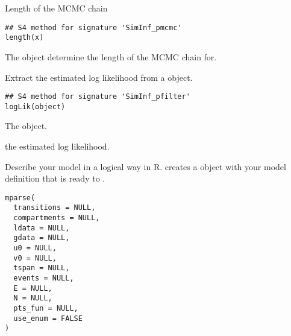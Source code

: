\documentclass[letterpaper]{book}
\begin{document}
%
\begin{Description}
Length of the MCMC chain
\end{Description}
%
\begin{Usage}
\begin{verbatim}
## S4 method for signature 'SimInf_pmcmc'
length(x)
\end{verbatim}
\end{Usage}
%
\begin{Arguments}
\begin{ldescription}
\item[\code{x}] The  object determine the length of
the MCMC chain for.
\end{ldescription}
\end{Arguments}
%
\begin{Description}
Extract the estimated log likelihood from a 
object.
\end{Description}
%
\begin{Usage}
\begin{verbatim}
## S4 method for signature 'SimInf_pfilter'
logLik(object)
\end{verbatim}
\end{Usage}
%
\begin{Arguments}
\begin{ldescription}
\item[\code{object}] The  object.
\end{ldescription}
\end{Arguments}
%
\begin{Value}
the estimated log likelihood.
\end{Value}
%
\begin{Description}
Describe your model in a logical way in R.  creates a
 object with your model
definition that is ready to .
\end{Description}
%
\begin{Usage}
\begin{verbatim}
mparse(
  transitions = NULL,
  compartments = NULL,
  ldata = NULL,
  gdata = NULL,
  u0 = NULL,
  v0 = NULL,
  tspan = NULL,
  events = NULL,
  E = NULL,
  N = NULL,
  pts_fun = NULL,
  use_enum = FALSE
)
\end{verbatim}
\end{Usage}
\end{document}
